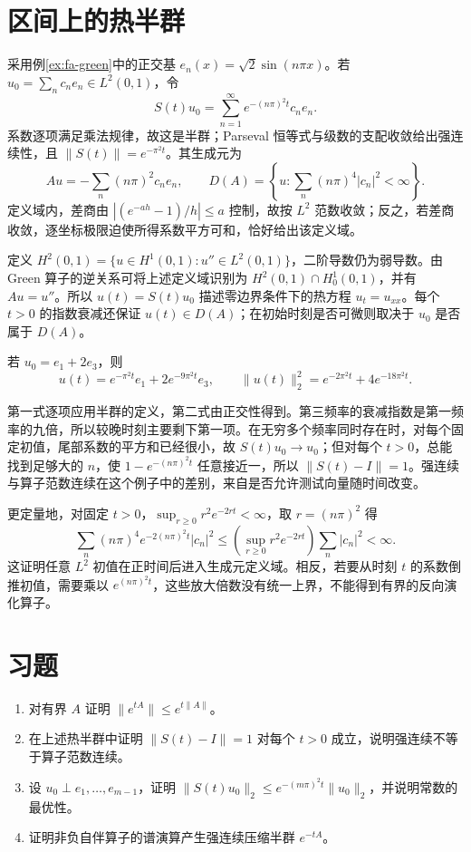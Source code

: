 \documentclass[UTF8,12pt,a4paper,fontset=fandol]{ctexbook}
\begin{document}
\section{区间上的热半群}
采用例\ref{ex:fa-green}中的正交基 $e_n(x)=\sqrt2\sin(n\pi x)$。若 $u_0=\sum_nc_ne_n\in L^2(0,1)$，令
\[
 S(t)u_0=\sum_{n=1}^{\infty}e^{-(n\pi)^2t}c_ne_n.
\]
系数逐项满足乘法规律，故这是半群；Parseval 恒等式与级数的支配收敛给出强连续性，且 $\|S(t)\|=e^{-\pi^2t}$。其生成元为
\[
 Au=-\sum_n(n\pi)^2c_ne_n,\qquad
 D(A)=\left\{u:\sum_n(n\pi)^4|c_n|^2<\infty\right\}.
\]
定义域内，差商由 $|(e^{-ah}-1)/h|\leq a$ 控制，故按 $L^2$ 范数收敛；反之，若差商收敛，逐坐标极限迫使所得系数平方可和，恰好给出该定义域。

定义 $H^2(0,1)=\{u\in H^1(0,1):u''\in L^2(0,1)\}$，二阶导数仍为弱导数。由 Green 算子的逆关系可将上述定义域识别为 $H^2(0,1)\cap H_0^1(0,1)$，并有 $Au=u''$。所以 $u(t)=S(t)u_0$ 描述零边界条件下的热方程 $u_t=u_{xx}$。每个 $t>0$ 的指数衰减还保证 $u(t)\in D(A)$；在初始时刻是否可微则取决于 $u_0$ 是否属于 $D(A)$。

\begin{example}[两个频率的衰减速度]
若 $u_0=e_1+2e_3$，则
\[
 u(t)=e^{-\pi^2t}e_1+2e^{-9\pi^2t}e_3,
 \qquad\|u(t)\|_2^2=e^{-2\pi^2t}+4e^{-18\pi^2t}.
\]
\end{example}
\begin{solve}
第一式逐项应用半群的定义，第二式由正交性得到。第三频率的衰减指数是第一频率的九倍，所以较晚时刻主要剩下第一项。在无穷多个频率同时存在时，对每个固定初值，尾部系数的平方和已经很小，故 $S(t)u_0\to u_0$；但对每个 $t>0$，总能找到足够大的 $n$，使 $1-e^{-(n\pi)^2t}$ 任意接近一，所以 $\|S(t)-I\|=1$。强连续与算子范数连续在这个例子中的差别，来自是否允许测试向量随时间改变。
\end{solve}

更定量地，对固定 $t>0$，$\sup_{r\geq0}r^2e^{-2rt}<\infty$，取 $r=(n\pi)^2$ 得
\[
 \sum_n(n\pi)^4e^{-2(n\pi)^2t}|c_n|^2
 \leq\left(\sup_{r\geq0}r^2e^{-2rt}\right)\sum_n|c_n|^2<\infty.
\]
这证明任意 $L^2$ 初值在正时间后进入生成元定义域。相反，若要从时刻 $t$ 的系数倒推初值，需要乘以 $e^{(n\pi)^2t}$，这些放大倍数没有统一上界，不能得到有界的反向演化算子。

\section{习题}
\begin{enumerate}
 \item 对有界 $A$ 证明 $\|e^{tA}\|\leq e^{t\|A\|}$。
 \item 在上述热半群中证明 $\|S(t)-I\|=1$ 对每个 $t>0$ 成立，说明强连续不等于算子范数连续。
 \item 设 $u_0\perp e_1,\ldots,e_{m-1}$，证明 $\|S(t)u_0\|_2\leq e^{-(m\pi)^2t}\|u_0\|_2$，并说明常数的最优性。
 \item 证明非负自伴算子的谱演算产生强连续压缩半群 $e^{-tA}$。
\end{enumerate}
\end{document}
